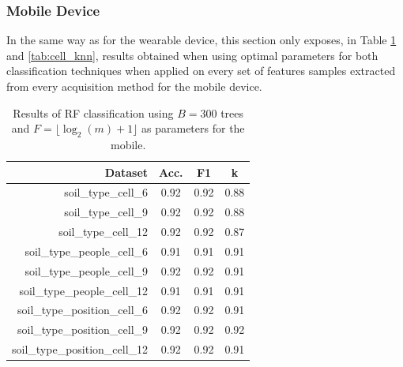 \documentclass[10pt,conference]{IEEEtran}
\begin{document}

\subsubsection{Mobile Device}
In the same way as for the wearable device, this section only exposes, in Table \ref{tab:cell_rf} and \ref{tab:cell_knn}, results obtained when using optimal parameters for both classification techniques when applied on every set of features samples extracted from every acquisition method for the mobile device.

\begin{table}[!ht]
	\centering
	\caption{Results of RF classification using $B=300$ trees and $F=\lfloor\log_2(m)+1\rfloor$ as parameters for the mobile.}
	\label{tab:cell_rf}
	\scalebox{0.75}
	{
		\begin{tabular}{rccc}
			\toprule
			    \textbf{Dataset}
			    & \textbf{Acc.}
			    & \textbf{F1}
			    & \textbf{k} \\
			\midrule
                soil\_type\_cell\_6            & 0.92 & 0.92 & 0.88                     \\
                soil\_type\_cell\_9            & 0.92 & 0.92 & 0.88                     \\
                soil\_type\_cell\_12           & 0.92 & 0.92 & 0.87                     \\
                soil\_type\_people\_cell\_6    & 0.91 & 0.91 & 0.91                     \\
                soil\_type\_people\_cell\_9    & 0.92 & 0.92 & \cellcolor{black!25}0.91 \\
                soil\_type\_people\_cell\_12   & 0.91 & 0.91 & 0.91                     \\
                soil\_type\_position\_cell\_6  & 0.92 & 0.92 & 0.91                     \\
                soil\_type\_position\_cell\_9  & 0.92 & 0.92 & \cellcolor{black!25}0.92 \\
                soil\_type\_position\_cell\_12 & 0.92 & 0.92 & 0.91                     \\
            \bottomrule
		\end{tabular}
	}
\end{table}
\end{document}
